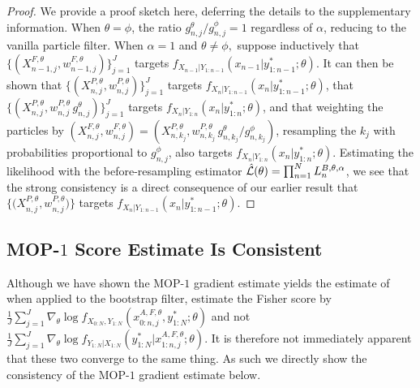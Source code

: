 \documentclass[numsec,webpdf,modern,medium,namedate]{oup-authoring-template}
\newcommand\arxiv[2]{#2} %
\theoremstyle{thmstyleone}%
\theoremstyle{thmstyletwo}%
\theoremstyle{thmstylethree}%
\begin{document}

\begin{proof}
    We provide a proof sketch here, deferring the details to \arxiv{Appendix~\ref{appendix:targeting}}{the supplementary information}. 
    When $\theta=\phi$, the ratio ${g_{n,j}^\theta}/{g_{n,j}^\phi}=1$ regardless of $\alpha$, reducing to the vanilla particle filter.
    When $\alpha=1$ and $\theta\neq\phi,$ suppose inductively that $\{(X^{F,\theta}_{n-1,j},w^{F,\theta}_{n-1,j})\}_{j=1}^J$ targets $f_{X_{n-1}|Y_{1:n-1}}(x_{n-1}|y^*_{1:n-1};\theta)$.
    It can then be shown that $\{(X^{P,\theta}_{n,j},w^{P,\theta}_{n,j})\}_{j=1}^J$ targets $f_{X_{n}|Y_{1:n-1}}(x_{n}|y^*_{1:n-1};\theta)$, that $\{(X^{P,\theta}_{n,j},w^{P,\theta}_{n,j} \, g^\theta_{n,j} )\}_{j=1}^J$ targets  $f_{X_{n}|Y_{1:n}}(x_{n}|y^*_{1:n};\theta)$, and that weighting the particles by $(X^{F,\theta}_{n,j},w^{F,\theta}_{n,j}) = (X^{P,\theta}_{n,k_j}, w^{P,\theta}_{n,k_j} \, g^\theta_{n,k_j} \big/ g^\phi_{n,k_j})$,
    resampling the $k_j$ with probabilities proportional to $g^\phi_{n,j}$, also targets $f_{X_{n}|Y_{1:n}}(x_{n}|y^*_{1:n};\theta)$.
    Estimating the likelihood with the before-resampling estimator $\hat{\mathcal{L}}(\theta) = \prod_{n=1}^N L_n^{B,\theta,\alpha}$, we see that the strong consistency is a direct consequence of our earlier result that $\{ \big(X^{P,\theta}_{n,j},w^{P,\theta}_{n,j}\big) \}$ targets $f_{X_{n}|Y_{1:n-1}}(x_{n}|y^*_{1:n-1};\theta)$. 
\end{proof}

\arxiv{}{\vspace*{-4mm}}
\subsection{MOP-$1$ Score Estimate Is Consistent}

Although we have shown the MOP-$1$ gradient estimate yields the estimate of \citep{poyiadjis11, scibior21} when applied to the bootstrap filter, \cite{poyiadjis11, scibior21} estimate the Fisher score by 
$\frac{1}{J}\sum_{j=1}^J \nabla_\theta \log f_{X_{0:N}, Y_{1:N}}(x_{0:n,j}^{A, F,\theta}, y_{1:N}^* ; \theta)$ and not
$\frac{1}{J}\sum_{j=1}^J \nabla_\theta \log f_{Y_{1:N}| X_{1:N}}(y_{1:N}^* | x_{1:n,j}^{A, F,\theta}; \theta).$
It is therefore not immediately apparent that these two converge to the same thing. As such we directly show the consistency of the MOP-$1$ gradient estimate below. 
\end{document}
